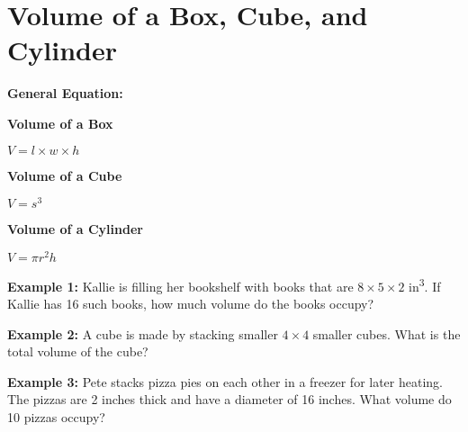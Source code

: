 \section[Volumes]{Volume of a Box, Cube, and Cylinder}

\textbf{General Equation:}

\begin{center}
\setlength{\columnseprule}{0pt}
\begin{multicols}{3}
\textbf{Volume of a Box}

$V=l\times w\times h$

\textbf{Volume of a Cube}

$V=s^3$

\textbf{Volume of a Cylinder}

$V=\pi r^2h$
\end{multicols}
\end{center}

\vfill\textbf{Example 1:} Kallie is filling her bookshelf with books that are $8\times5\times2$ in\textsuperscript{3}. If Kallie has 16 such books, how much volume do the books occupy?

\vfill\textbf{Example 2:} A cube is made by stacking smaller $4\times4$ smaller cubes. What is the total volume of the cube?

\vfill\textbf{Example 3:} Pete stacks pizza pies on each other in a freezer for later heating. The pizzas are 2 inches thick and have a diameter of 16 inches. What volume do 10 pizzas occupy?

